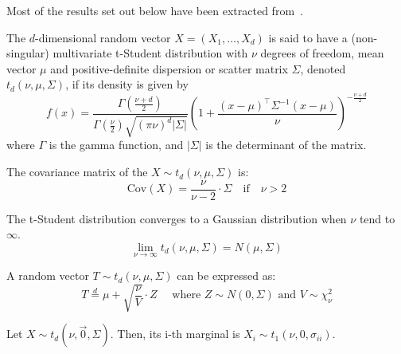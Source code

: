 \documentclass[11pt,fleqn]{book} %
\begin{document}
Most of the results set out below have been extracted from~\cite{kotz:2004,demarta:2005}.

\begin{definition}
	The $d$-dimensional random vector $X=(X_1,\dots,X_d)$ is said to have a 
	(non-singular) multivariate t-Student distribution with $\nu$ degrees of freedom, 
	mean vector $\mu$ and positive-definite dispersion or scatter matrix $\Sigma$, 
	denoted $t_d(\nu,\mu,\Sigma)$, if its density is given by
	\begin{displaymath}
		f(x)=\frac{\Gamma\left(\frac{\nu+d}{2}\right)}{\Gamma\left(\frac{\nu}{2}\right)\sqrt{(\pi \nu)^d |\Sigma|}}
		\left(
		1+ \frac{(x-\mu)^\top\Sigma^{-1}(x-\mu)}{\nu}
		\right)^{-\frac{\nu+d}{2}}
	\end{displaymath}
	\noindent where $\Gamma$ is the gamma function, and $|\Sigma|$ is the 
	determinant of the matrix.
\end{definition}

\begin{proposition}
	The covariance matrix of the $X \sim t_d(\nu,\mu,\Sigma)$ is:
	\begin{displaymath}
		\text{Cov}(X) = \frac{\nu}{\nu-2} \cdot \Sigma \quad \text{if} \quad \nu > 2
	\end{displaymath}
\end{proposition}

\begin{proposition}
	The t-Student distribution converges to a Gaussian distribution 
	when $\nu$ tend to $\infty$.
	\begin{displaymath}
		\lim_{\nu \to \infty} t_d(\nu,\mu,\Sigma) = N(\mu,\Sigma)
	\end{displaymath}
\end{proposition}

\begin{proposition}
	\label{prop:mtschar}
	A random vector $T \sim t_d(\nu,\mu,\Sigma)$ can be expressed as:
	\begin{displaymath}
		T \stackrel{d}{=} \mu + \sqrt{\frac{\nu}{V}}\cdot Z
		\quad \text{ where } Z \sim N(0,\Sigma) \text{ and } V \sim \chi_{\nu}^2
	\end{displaymath}
\end{proposition}

\begin{proposition}
	Let $X \sim t_d(\nu,\vec{0},\Sigma)$. Then, its i-th marginal is 
	$X_i \sim t_1(\nu,0,\sigma_{ii})$.
\end{proposition}
\end{document}
